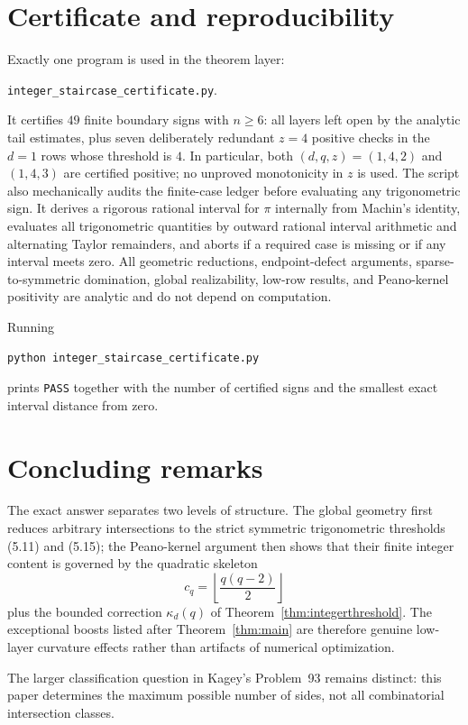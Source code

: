 \documentclass[11pt]{article}
\theoremstyle{remark}
\begin{document}
\section{Certificate and reproducibility}

Exactly one program is used in the theorem layer:
\begin{center}
\texttt{integer\_staircase\_certificate.py}.
\end{center}
It certifies $49$ finite boundary signs with $n\ge6$: all layers left open by the analytic tail estimates, plus seven deliberately redundant $z=4$ positive checks in the $d=1$ rows whose threshold is $4$. In particular, both $(d,q,z)=(1,4,2)$ and $(1,4,3)$ are certified positive; no unproved monotonicity in $z$ is used. The script also mechanically audits the finite-case ledger before evaluating any trigonometric sign. It derives a rigorous rational interval for $\pi$ internally from Machin's identity, evaluates all trigonometric quantities by outward rational interval arithmetic and alternating Taylor remainders, and aborts if a required case is missing or if any interval meets zero. All geometric reductions, endpoint-defect arguments, sparse-to-symmetric domination, global realizability, low-row results, and Peano-kernel positivity are analytic and do not depend on computation.

Running
\begin{verbatim}
python integer_staircase_certificate.py
\end{verbatim}
prints \texttt{PASS} together with the number of certified signs and the smallest exact interval distance from zero.

\section{Concluding remarks}

The exact answer separates two levels of structure. The global geometry first reduces arbitrary intersections to the strict symmetric trigonometric thresholds (5.11) and (5.15); the Peano-kernel argument then shows that their finite integer content is governed by the quadratic skeleton
\[
c_q=\left\lfloor\frac{q(q-2)}2\right\rfloor
\]
plus the bounded correction $\kappa_d(q)$ of Theorem~\ref{thm:integerthreshold}. The exceptional boosts listed after Theorem~\ref{thm:main} are therefore genuine low-layer curvature effects rather than artifacts of numerical optimization.

The larger classification question in Kagey's Problem~93 remains distinct: this paper determines the maximum possible number of sides, not all combinatorial intersection classes.
\end{document}
